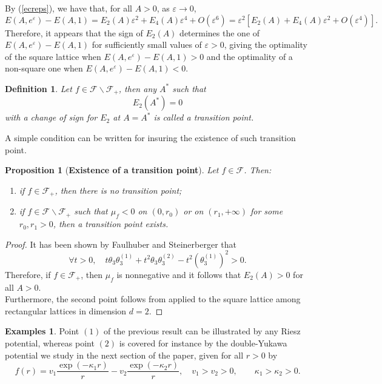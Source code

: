 \documentclass[12pt]{interact}
\newtheorem{defi}[thm]{Definition}
\newtheorem{prop}[thm]{Proposition}
\theoremstyle{definition}
\newtheorem{examples}[thm]{Examples}
\begin{document}
By (\ref{ecreps}), we have that, for all $A>0$, as $\varepsilon\to 0$,
$$
E(A,e^\varepsilon)-E(A,1) = E_2(A)\varepsilon^2 + E_4(A)\varepsilon^4
+O(\varepsilon^6) = \varepsilon^2\left[ E_2(A)+ E_4(A)\varepsilon^2
+ O(\varepsilon^4)\right].
$$
Therefore, it appears that the sign of $E_2(A)$ determines the one of
$E(A,e^\varepsilon)-E(A,1)$ for sufficiently small values of $\varepsilon>0$,
giving the optimality of the square lattice when $E(A,e^\varepsilon)-E(A,1)>0$
and the optimality of a non-square one when $E(A,e^\varepsilon)-E(A,1)<0$.

\begin{defi}
Let $f\in \mathcal{F}\backslash \mathcal{F}_+$, then any $A^*$ such that 
\begin{equation}\label{transpointenlarged}
E_2(A^*)=0
\end{equation}
with a change of sign for $E_2$ at $A=A^*$ is called a transition point.
\end{defi}

A simple condition can be written for insuring the existence of such transition point.

\begin{prop}[\textbf{Existence of a transition point}] \label{prop:transition} Let $f\in \mathcal{F}$. Then:
\begin{enumerate}
\item if $f\in \mathcal{F}_+$, then there is no transition point;
\item if $f\in \mathcal{F}\backslash \mathcal{F}_+$ such that $\mu_f<0$ on $(0,r_0)$ or on $(r_1,+\infty)$ for some $r_0, r_1>0$, then a transition point exists.
\end{enumerate}
\end{prop}
\begin{proof} 
It has been shown by Faulhuber and Steinerberger \cite{Faulhuber17} that
$$
\forall t>0,\quad t \theta_3 \theta_3^{(1)} + t^2 \theta_3 \theta_3^{(2)}
- t^2 \left( \theta_3^{(1)} \right)^2>0.
$$
Therefore, if $f\in \mathcal{F}_+$, then $\mu_f$ is nonnegative and it follows that $E_2(A)>0$ for all $A>0$.\\
Furthermore, the second point follows from \cite[Prop. 4.4]{BetPetrache19} applied to the square lattice among rectangular lattices in dimension $d=2$.
\end{proof}
\begin{examples}
Point $(1)$ of the previous result can be illustrated by any Riesz potential, whereas point $(2)$ is covered for instance by the double-Yukawa potential we study in the next section of the paper, given for all $r>0$ by
\begin{equation*}
f(r) = v_1 \frac{\exp{(-\kappa_1 r)}}{r} - v_2 \frac{\exp{(-\kappa_2 r)}}{r}, \quad v_1 > v_2 >0,\qquad \kappa_1 > \kappa_2 > 0.
\end{equation*}

\end{examples}
\end{document}
